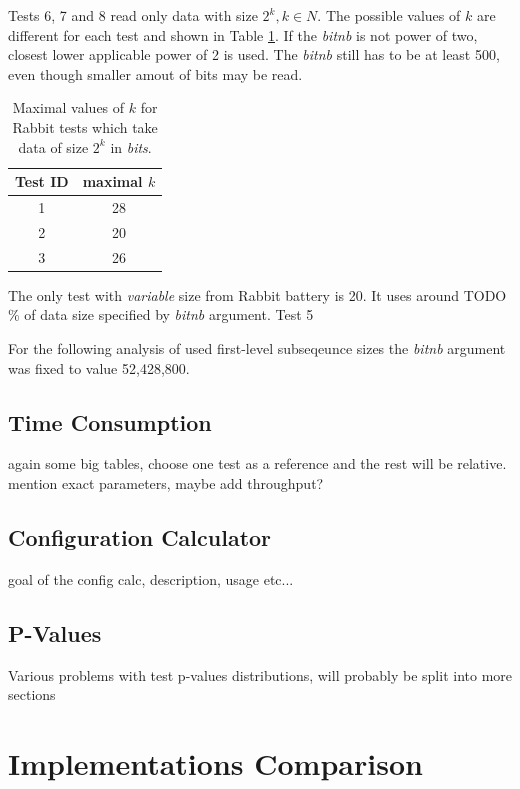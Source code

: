 \documentclass[
  digital,     %
  oneside,     %
  nosansbold,  %
  nocolorbold, %
  nolof,         %
  nolot,         %
]{fithesis4}
\begin{document}
Tests 6, 7 and 8 read only data with size $2^k, k \in N$. The possible values of $k$ are different for each test and shown in Table \ref{tab:analysis_rabbit_two_powers}. \cite[p. 124-126]{tu01guide} If the \emph{bit\textunderscore nb} is not power of two, closest lower applicable power of 2 is used. The \emph{bit\textunderscore nb} still has to be at least 500, even though smaller amout of bits may be read.

\begin{table}
  \begin{tabularx}{0.5\textwidth}{c|c}
    Test ID & maximal $k$\\
    \midrule
    1& 28\\
    2& 20\\
    3& 26\\
 
  \end{tabularx}
  \caption{Maximal values of $k$ for Rabbit tests which take data of size $2^k$ in \emph{bits}.}
  \label{tab:analysis_rabbit_two_powers}
\end{table}

The only test with \emph{variable} size from Rabbit battery is 20. It uses around TODO \% of data size specified by \emph{bit\textunderscore nb} argument. Test 5 

For the following analysis of used first-level subseqeunce sizes the \emph{bit\textunderscore nb} argument was fixed to value 52,428,800.


\section{Time Consumption} 
again some big tables, choose one test as a reference and the rest will be relative. mention exact parameters, maybe add throughput?
\section{Configuration Calculator}
goal of the config calc, description, usage etc...
\section{P-Values}
Various problems with test p-values distributions, will probably be split into more sections



\chapter{Implementations Comparison}
\end{document}
